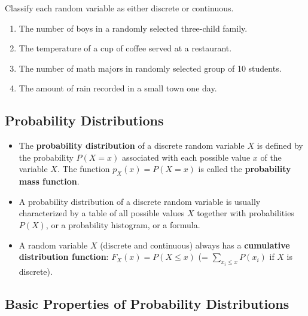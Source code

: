 \begin{exercise}

Classify each random variable as either discrete or continuous.

\begin{enumerate}
\item
  The number of boys in a randomly selected three-child family.
\item
  The temperature of a cup of coffee served at a restaurant.
\item
  The number of math majors in randomly selected group of 10 students.
\item
  The amount of rain recorded in a small town one day.
\end{enumerate}

\end{exercise}

\hypertarget{probability-distributions}{%
\subsection{Probability Distributions}\label{probability-distributions}}

\begin{itemize}
\item
  The \textbf{probability distribution} of a discrete random variable
  \(X\) is defined by the probability \(P(X=x)\) associated with each
  possible value \(x\) of the variable \(X\). The function
  \(p_X(x)=P(X=x)\) is called the \textbf{probability mass function}.
\item
  A probability distribution of a discrete random variable is usually
  characterized by a table of all possible values \(X\) together with
  probabilities \(P(X)\), or a probability histogram, or a formula.
\item
  A random variable \(X\) (discrete and continuous) always has a
  \textbf{cumulative distribution function}: \(F_X(x)=P(X\leq x)\) (=
  \(\sum\limits_{x_i\leq x} P(x_i)\) if \(X\) is discrete).
\end{itemize}

\hypertarget{basic-properties-of-probability-distributions}{%
\subsection{Basic Properties of Probability
Distributions}\label{basic-properties-of-probability-distributions}}

